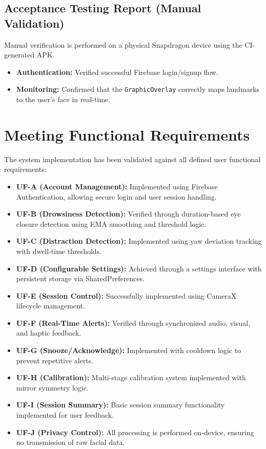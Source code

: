 \documentclass[11pt]{report}
\begin{document}
\subsection{Acceptance Testing Report (Manual Validation)}  %
Manual verification is performed on a physical Snapdragon device using the CI-generated APK.
\begin{itemize}
    \item \textbf{Authentication:} Verified successful Firebase login/signup flow.
    \item \textbf{Monitoring:} Confirmed that the \texttt{GraphicOverlay} correctly maps landmarks to the user's face in real-time.
\end{itemize}

\section{Meeting Functional Requirements}  %

The system implementation has been validated against all defined user functional requirements:

\begin{itemize}
    \item \textbf{UF-A (Account Management):} Implemented using Firebase Authentication, allowing secure login and user session handling.

    \item \textbf{UF-B (Drowsiness Detection):} Verified through duration-based eye closure detection using EMA smoothing and threshold logic.

    \item \textbf{UF-C (Distraction Detection):} Implemented using yaw deviation tracking with dwell-time thresholds.

    \item \textbf{UF-D (Configurable Settings):} Achieved through a settings interface with persistent storage via SharedPreferences.

    \item \textbf{UF-E (Session Control):} Successfully implemented using CameraX lifecycle management.

    \item \textbf{UF-F (Real-Time Alerts):} Verified through synchronized audio, visual, and haptic feedback.

    \item \textbf{UF-G (Snooze/Acknowledge):} Implemented with cooldown logic to prevent repetitive alerts.

    \item \textbf{UF-H (Calibration):} Multi-stage calibration system implemented with mirror symmetry logic.

    \item \textbf{UF-I (Session Summary):} Basic session summary functionality implemented for user feedback.

    \item \textbf{UF-J (Privacy Control):} All processing is performed on-device, ensuring no transmission of raw facial data.
\end{itemize}
\end{document}

